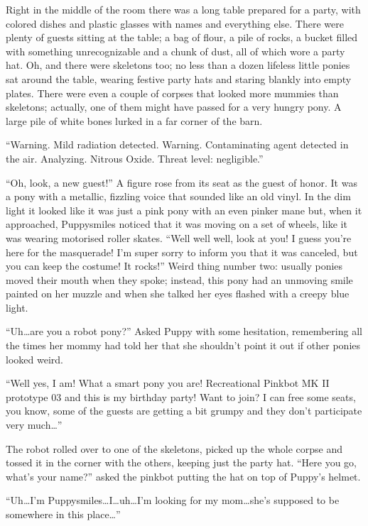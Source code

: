 Right in the middle of the room there was a long table prepared for a party, with colored dishes and plastic glasses with names and everything else. There were plenty of guests sitting at the table; a bag of flour, a pile of rocks, a bucket filled with something unrecognizable and a chunk of dust, all of which wore a party hat. Oh, and there were skeletons too; no less than a dozen lifeless little ponies sat around the table, wearing festive party hats and staring blankly into empty plates. There were even a couple of corpses that looked more mummies than skeletons; actually, one of them might have passed for a very hungry pony. A large pile of white bones lurked in a far corner of the barn.

``{\mt Warning. Mild radiation detected. Warning. Contaminating agent detected in the air. Analyzing. Nitrous Oxide. Threat level: negligible.}''

``Oh, look, a new guest!'' A figure rose from its seat as the guest of honor. It was a pony with a metallic, fizzling voice that sounded like an old vinyl. In the dim light it looked like it was just a pink pony with an even pinker mane but, when it approached, Puppysmiles noticed that it was moving on a set of wheels, like it was wearing motorised roller skates. ``Well well well, look at you! I guess you're here for the masquerade! I'm super sorry to inform you that it was canceled, but you can keep the costume! It rocks!'' Weird thing number two: usually ponies moved their mouth when they spoke; instead, this pony had an unmoving smile painted on her muzzle and when she talked her eyes flashed with a creepy blue light.

``Uh\dots are you a robot pony?'' Asked Puppy with some hesitation, remembering all the times her mommy had told her that she shouldn't point it out if other ponies looked weird.

``Well yes, I am! What a smart pony you are! Recreational Pinkbot MK II prototype 03 and this is my birthday party! Want to join? I can free some seats, you know, some of the guests are getting a bit grumpy and they don't participate very much\dots''

The robot rolled over to one of the skeletons, picked up the whole corpse and tossed it in the corner with the others, keeping just the party hat. ``Here you go, what's your name?'' asked the pinkbot putting the hat on top of Puppy's helmet.

``Uh\dots I'm Puppysmiles\dots I\dots uh\dots I'm looking for my mom\dots she's supposed to be somewhere in this place\dots''

